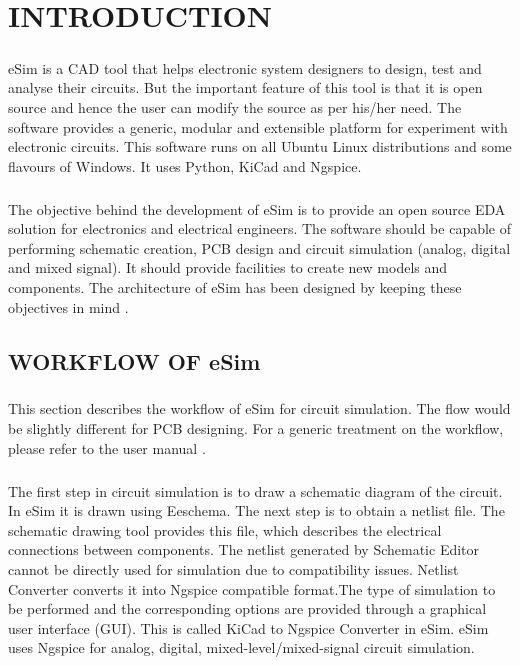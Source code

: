 \chapter{INTRODUCTION}

\paragraph{}eSim is a CAD tool that helps electronic system designers to design, test and analyse
their circuits. But the important feature of this tool is that it is open source and hence
the user can modify the source as per his/her need. The software provides a generic,
modular and extensible platform for experiment with electronic circuits. This software
runs on all Ubuntu Linux distributions and some flavours of Windows. It uses Python,
KiCad and Ngspice.

\paragraph{}

The objective behind the development of eSim is to provide an open source EDA
solution for electronics and electrical engineers. The software should be capable of
performing schematic creation, PCB design and circuit simulation (analog, digital and
mixed signal). It should provide facilities to create new models and components. The
architecture of eSim has been designed by keeping these objectives in mind \cite{esimusermanual} .

\section*{WORKFLOW OF eSim}
\paragraph{}

This section describes the workflow of eSim for circuit simulation. The flow would be slightly different for PCB designing. For a generic treatment on the workflow, please refer to the user manual .

\paragraph{}

The first step in circuit simulation is to draw a schematic diagram of the circuit. In eSim it is drawn using Eeschema. The next step is to obtain a netlist file. The schematic drawing tool provides this file, which describes the electrical connections between components.
The netlist generated by Schematic Editor cannot be directly used for simulation due to compatibility issues. Netlist Converter converts it into Ngspice compatible format.The type of simulation to be performed and the corresponding options are provided through a graphical user interface (GUI). This is called KiCad to Ngspice Converter in eSim. 
eSim uses Ngspice for analog, digital, mixed-level/mixed-signal circuit simulation.


